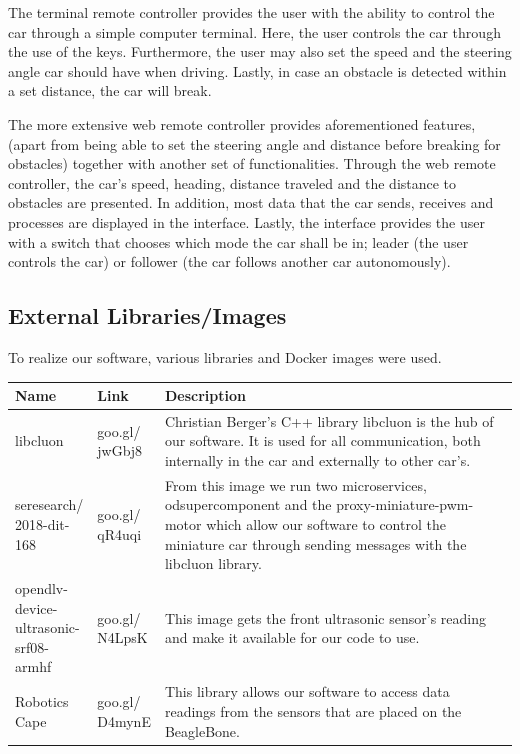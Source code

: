 \documentclass[12pt]{article}
\begin{document}
The terminal remote controller provides the user with the ability to control the car through a simple computer terminal. Here, the user controls the car through the use of the keys. Furthermore, the user may also set the speed and the steering angle car should have when driving. Lastly, in case an obstacle is detected within a set distance, the car will break.

The more extensive web remote controller provides aforementioned features, (apart from being able to set the steering angle and distance before breaking for obstacles) together with another set of functionalities. Through the web remote controller, the car's speed, heading, distance traveled and the distance to obstacles are presented. In addition, most data that the car sends, receives and processes are displayed in the interface. Lastly, the interface provides the user with a switch that chooses which mode the car shall be in; leader (the user controls the car) or follower (the car follows another car autonomously).

\subsection{External Libraries/Images}
To realize our software, various libraries and Docker images were used.

\begin{longtable}{ | p{0.15\linewidth} | p{0.11\linewidth} | p{0.74\linewidth} | }\hline 
	\textbf{Name} & \textbf{Link} & \textbf{Description} \\ \hline
	libcluon & goo.gl/ jwGbj8 & Christian Berger's C++ library libcluon is the hub of our software. It is used for all communication, both internally in the car and externally to other car's.\\ \hline
    seresearch/ 2018-dit-168 & goo.gl/ qR4uqi & From this image we run two microservices, odsupercomponent and the proxy-miniature-pwm-motor which allow our software to control the miniature car through sending messages with the libcluon library.\\ \hline
	opendlv-device-ultrasonic-srf08-armhf & goo.gl/ N4LpsK & This image gets the front ultrasonic sensor's reading and make it available for our code to use.\\ \hline
    Robotics Cape & goo.gl/ D4mynE & This library allows our software to access data readings from the sensors that are placed on the BeagleBone.\\ \hline
\end{longtable}
\end{document}
